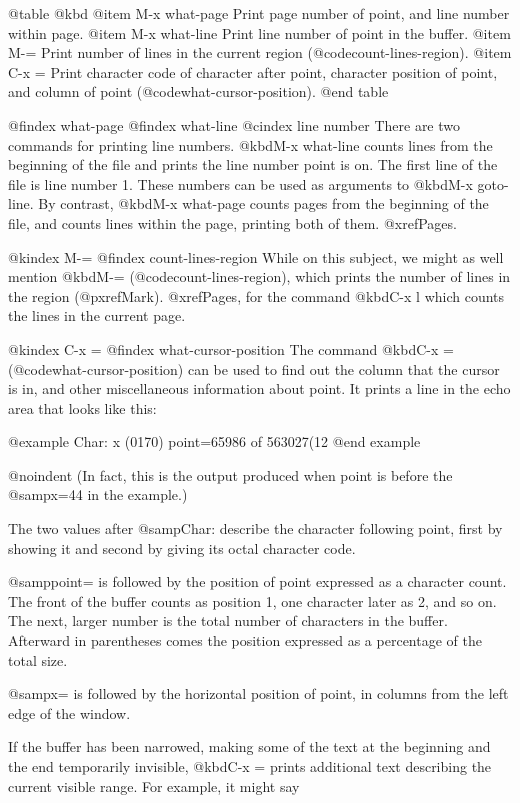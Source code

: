 {{{{{{@table @kbd
@item M-x what-page
Print page number of point, and line number within page.
@item M-x what-line
Print line number of point in the buffer.
@item M-=
Print number of lines in the current region (@code{count-lines-region}).
@item C-x =
Print character code of character after point, character position of
point, and column of point (@code{what-cursor-position}).
@end table

@findex what-page
@findex what-line
@cindex line number
  There are two commands for printing line numbers.  @kbd{M-x what-line}
counts lines from the beginning of the file and prints the line number
point is on.  The first line of the file is line number 1.  These numbers
can be used as arguments to @kbd{M-x goto-line}.  By contrast, @kbd{M-x
what-page} counts pages from the beginning of the file, and counts lines
within the page, printing both of them.  @xref{Pages}.

@kindex M-=
@findex count-lines-region
  While on this subject, we might as well mention @kbd{M-=} (@code{count-lines-region}),
which prints the number of lines in the region (@pxref{Mark}).
@xref{Pages}, for the command @kbd{C-x l} which counts the lines in the
current page.

@kindex C-x =
@findex what-cursor-position
  The command @kbd{C-x =} (@code{what-cursor-position}) can be used to find out
the column that the cursor is in, and other miscellaneous information about
point.  It prints a line in the echo area that looks like this:

@example
Char: x (0170)  point=65986 of 563027(12%
@end example

@noindent
(In fact, this is the output produced when point is before the @samp{x=44}
in the example.)

  The two values after @samp{Char:} describe the character following point,
first by showing it and second by giving its octal character code.

  @samp{point=} is followed by the position of point expressed as a character
count.  The front of the buffer counts as position 1, one character later
as 2, and so on.  The next, larger number is the total number of characters
in the buffer.  Afterward in parentheses comes the position expressed as a
percentage of the total size.

  @samp{x=} is followed by the horizontal position of point, in columns from the
left edge of the window.

  If the buffer has been narrowed, making some of the text at the beginning and
the end temporarily invisible, @kbd{C-x =} prints additional text describing the
current visible range.  For example, it might say

}}}}}}
